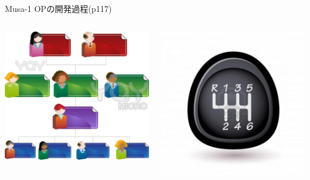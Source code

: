\begin{frame}{Musa-1 OPの開発過程(p117)}
\begin{columns}

\begin{column}{0.23\textwidth}
\begin{center}
\includegraphics[height=\imageheight]{figure/orgchart.jpg}
\end{center}
\end{column}

\begin{column}{0.2\textwidth}
\begin{center}
\includegraphics[height=\imageheight]{figure/shifter.jpg}
\end{center}
\end{column}


\end{columns}
\end{frame}

